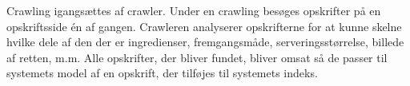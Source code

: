 {Crawling igangsættes af crawler. Under en crawling besøges opskrifter på en opskriftsside én af gangen. Crawleren analyserer opskrifterne for at kunne skelne hvilke dele af den der er ingredienser, fremgangsmåde, serveringsstørrelse, billede af retten, m.m. Alle opskrifter, der bliver fundet, bliver omsat så de passer til systemets model af en opskrift, der tilføjes til systemets indeks.}
{}
{}
